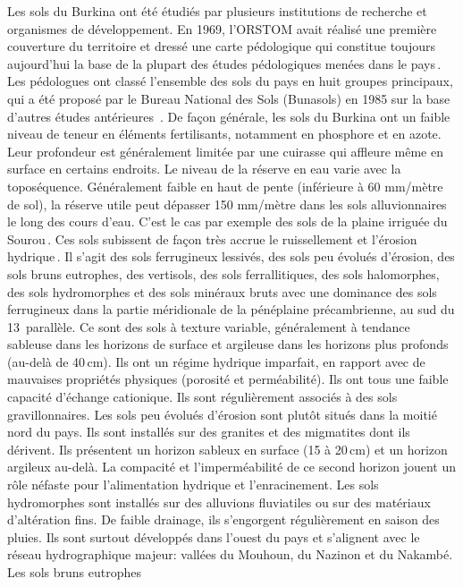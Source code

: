 \documentclass[a4paper,11pt]{article}
\begin{document}
Les sols du Burkina ont été étudiés par plusieurs institutions de
recherche et organismes de développement. En 1969, l'ORSTOM avait
réalisé une première couverture du territoire et dressé une carte
pédologique qui constitue toujours aujourd'hui la base de la plupart
des études pédologiques menées dans le pays\,\cite{BUNASOLS_1985}.
Les pédologues ont classé l'ensemble des sols du pays en huit groupes
principaux, qui a été proposé par le Bureau National des Sols
(Bunasols) en 1985 sur la base d'autres études antérieures
\,\cite{PERON_1975}. De façon générale, les sols du Burkina ont un
faible niveau de teneur en éléments fertilisants, notamment en
phosphore et en azote. Leur profondeur est généralement limitée par
une cuirasse qui affleure même en surface en certains endroits. Le
niveau de la réserve en eau varie avec la toposéquence. Généralement
faible en haut de pente (inférieure à 60 mm/mètre de sol), la réserve
utile peut dépasser 150 mm/mètre dans les sols alluvionnaires le long
des cours d'eau. C'est le cas par exemple des sols de la plaine
irriguée du Sourou\,\cite{SOMENICOU_1983}. Ces sols subissent de façon
très accrue le ruissellement et l'érosion
hydrique\,\cite{Roose_2004}. Il s'agit des sols ferrugineux lessivés,
des sols peu évolués d'érosion, des sols bruns eutrophes, des
vertisols, des sols ferrallitiques, des sols halomorphes, des sols
hydromorphes et des sols minéraux bruts avec une dominance des sols
ferrugineux dans la partie méridionale de la pénéplaine
précambrienne, au sud du 13\ieme\, parallèle. Ce sont des sols à
texture variable, généralement à tendance sableuse dans les horizons
de surface et argileuse dans les horizons plus profonds (au-delà de
40\,cm). Ils ont un régime hydrique imparfait, en rapport avec de
mauvaises propriétés physiques (porosité et perméabilité). Ils ont
tous une faible capacité d'échange cationique. Ils sont régulièrement
associés à des sols gravillonnaires. Les sols peu évolués d'érosion
sont plutôt situés dans la moitié nord du pays. Ils sont installés sur
des granites et des migmatites dont ils dérivent. Ils présentent un
horizon sableux en surface (15 à 20\,cm) et un horizon argileux
au-delà. La compacité et l'imperméabilité de ce second horizon jouent
un rôle néfaste pour l'alimentation hydrique et l'enracinement. Les
sols hydromorphes sont installés sur des alluvions fluviatiles ou sur
des matériaux d'altération fins. De faible drainage, ils s'engorgent
régulièrement en saison des pluies. Ils sont surtout développés dans
l'ouest du pays et s'alignent avec le réseau hydrographique majeur:
vallées du Mouhoun, du Nazinon et du Nakambé. Les sols bruns eutrophes
\end{document}
